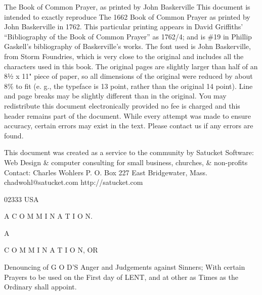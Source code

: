 
The Book of Common Prayer, as printed by John Baskerville This document is intended to exactly reproduce The 1662 Book of Common Prayer as printed by John Baskerville in 1762. This particular printing appears in David Griffiths' “Bibliography of the Book of Common Prayer” as 1762/4; and is \#19 in Phillip Gaskell's bibliography of Baskerville's works. The font used is John Baskerville, from Storm Foundries, which is very close to the original and includes all the characters used in this book. The original pages are slightly larger than half of an 8½ x 11" piece of paper, so all dimensions of the original were reduced by about 8\% to fit (e. g., the typeface is 13 point, rather than the original 14 point). Line and page breaks may be slightly different than in the original. You may redistribute this document electronically provided no fee is charged and this header remains part of the document. While every attempt was made to ensure accuracy, certain errors may exist in the text. Please contact us if any errors are found.

This document was created as a service to the community by Satucket Software: Web Design \& computer consulting for small business, churches, \& non-profits Contact: Charles Wohlers P. O. Box 227 East Bridgewater, Mass. chadwohl@satucket.com http://satucket.com

02333 USA

A C O M M I N A T I O N.

A

C O M M I N A T I O N, OR

Denouncing of G O D’S Anger and Judgements against Sinners; With certain Prayers to be used on the First day of LENT, and at other as Times as the Ordinary shall appoint.

